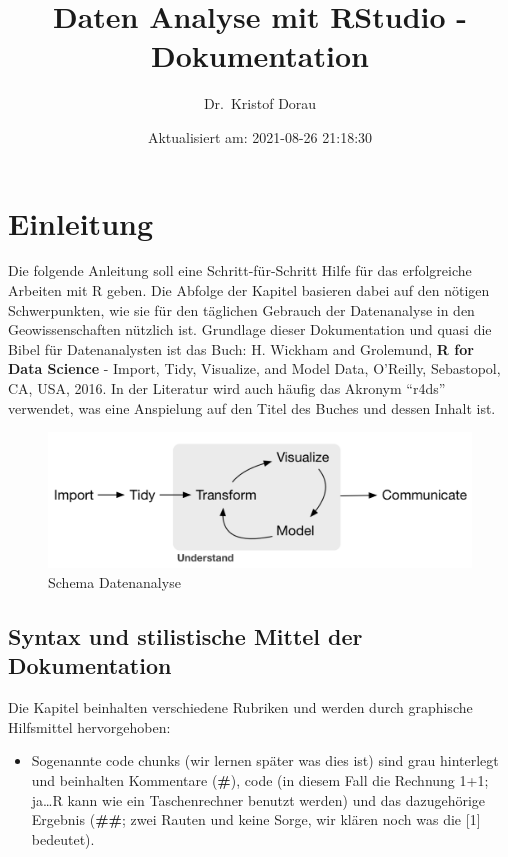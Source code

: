 \documentclass[
]{article}
\title{Daten Analyse mit RStudio - Dokumentation}
\author{Dr.~Kristof Dorau}
\date{Aktualisiert am: 2021-08-26 21:18:30}
\providecommand{\tightlist}{%
  \setlength{\itemsep}{0pt}\setlength{\parskip}{0pt}}
\begin{document}
\maketitle

{
\setcounter{tocdepth}{2}
\tableofcontents
}
\hypertarget{einleitung}{%
\section{Einleitung}\label{einleitung}}

Die folgende Anleitung soll eine Schritt-für-Schritt Hilfe für das erfolgreiche Arbeiten mit R geben. Die Abfolge der Kapitel basieren dabei auf den nötigen Schwerpunkten, wie sie für den täglichen Gebrauch der Datenanalyse in den Geowissenschaften nützlich ist. Grundlage dieser Dokumentation und quasi die Bibel für Datenanalysten ist das Buch: H. Wickham and Grolemund, \textbf{R for Data Science} - Import, Tidy, Visualize, and Model Data, O'Reilly, Sebastopol, CA, USA, 2016. In der Literatur wird auch häufig das Akronym ``r4ds'' verwendet, was eine Anspielung auf den Titel des Buches und dessen Inhalt ist.

\begin{figure}

{\centering \includegraphics[width=1\linewidth]{images/001} 

}

\caption{Schema Datenanalyse}\label{fig:unnamed-chunk-2}
\end{figure}

\hypertarget{syntax-und-stilistische-mittel-der-dokumentation}{%
\subsection{Syntax und stilistische Mittel der Dokumentation}\label{syntax-und-stilistische-mittel-der-dokumentation}}

Die Kapitel beinhalten verschiedene Rubriken und werden durch graphische Hilfsmittel hervorgehoben:

\begin{itemize}
\tightlist
\item
  Sogenannte code chunks (wir lernen später was dies ist) sind grau hinterlegt und beinhalten Kommentare (\textbf{\#}), code (in diesem Fall die Rechnung 1+1; ja\ldots R kann wie ein Taschenrechner benutzt werden) und das dazugehörige Ergebnis (\textbf{\#\#}; zwei Rauten und keine Sorge, wir klären noch was die {[}1{]} bedeutet).
\end{itemize}
\end{document}
